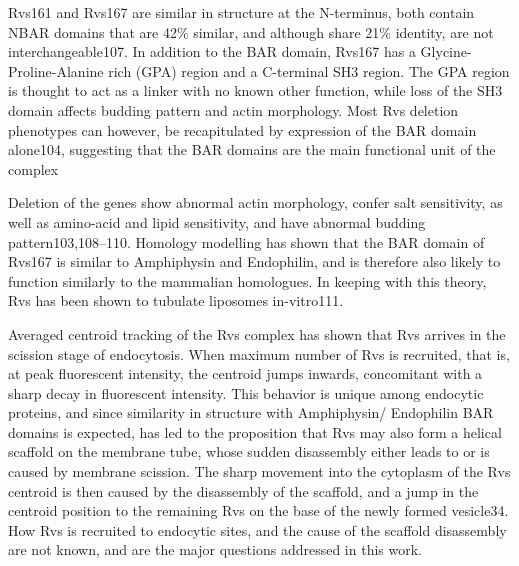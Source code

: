 		
	\vspace{5mm}
	Rvs161 and Rvs167 are similar in structure at the N-terminus, both contain NBAR domains that are 42\% similar, and although share 21\% identity, are not interchangeable107. In addition to the BAR domain, Rvs167 has a Glycine-Proline-Alanine rich (GPA) region and a C-terminal SH3 region. The GPA region is thought to act as a linker with no known other function, while loss of the SH3 domain affects budding pattern and actin morphology. Most Rvs deletion phenotypes can however, be recapitulated by expression of the BAR domain alone104, suggesting that the BAR domains are the main functional unit of the complex 

	\vspace{5mm}
	Deletion of the genes show abnormal actin morphology, confer salt sensitivity, as well as amino-acid and lipid sensitivity, and have abnormal budding pattern103,108–110. Homology modelling has shown that the BAR domain of Rvs167 is similar to Amphiphysin and Endophilin, and is therefore also likely to function similarly to the mammalian homologues. In keeping with this theory, Rvs has been shown to tubulate liposomes in-vitro111. 

		
	\vspace{5mm}
	Averaged centroid tracking of the Rvs complex has shown that Rvs arrives in the scission stage of endocytosis. When maximum number of Rvs is recruited, that is, at peak fluorescent intensity, the centroid jumps inwards, concomitant with a sharp decay in fluorescent intensity. This behavior is unique among endocytic proteins, and since similarity in structure with Amphiphysin/ Endophilin BAR domains is expected, has led to the proposition that Rvs may also form a helical scaffold on the membrane tube, whose sudden disassembly either leads to or is caused by membrane scission. The sharp movement into the cytoplasm of the Rvs centroid is then caused by the disassembly of the scaffold, and a jump in the centroid position to the remaining Rvs on the base of the newly formed vesicle34. How Rvs is recruited to endocytic sites, and the cause of the scaffold disassembly are not known, and are the major questions addressed in this work.

